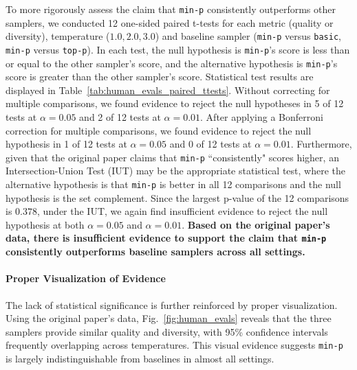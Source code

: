 To more rigorously assess the claim that \texttt{min-p} consistently outperforms other samplers, we conducted 12 one-sided paired t-tests for each metric (quality or diversity), temperature ($1.0, 2.0, 3.0$) and baseline sampler (\texttt{min-p} versus \texttt{basic}, \texttt{min-p} versus \texttt{top-p}). In each test, the null hypothesis is \texttt{min-p}'s score is less than or equal to the other sampler's score, and the alternative hypothesis is \texttt{min-p}'s score is greater than the other sampler's score.
Statistical test results are displayed in Table~\ref{tab:human_evals_paired_ttests}.
Without correcting for multiple comparisons, we found evidence to reject the null hypotheses in 5 of 12 tests at $\alpha=0.05$ and 2 of 12 tests at $\alpha=0.01$. After applying a Bonferroni correction for multiple comparisons, we found evidence to reject the null hypothesis in 1 of 12 tests at $\alpha=0.05$ and 0 of 12 tests at $\alpha=0.01$.
Furthermore, given that the original paper claims that \texttt{min-p} ``consistently" scores higher, an Intersection-Union Test (IUT) may be the appropriate statistical test, where the alternative hypothesis is that \texttt{min-p} is better in all 12 comparisons and the null hypothesis is the set complement. Since the largest p-value of the 12 comparisons is $0.378$, under the IUT, we again find insufficient evidence to reject the null hypothesis at both $\alpha=0.05$ and $\alpha=0.01$.
\textbf{Based on the original paper's data, there is insufficient evidence to support the claim that \texttt{min-p} consistently outperforms baseline samplers across all settings.}



\paragraph{Proper Visualization of Evidence}

The lack of statistical significance is further reinforced by proper visualization. Using the original paper's data, Fig.~\ref{fig:human_evals} reveals that the three samplers provide similar quality and diversity, with 95\% confidence intervals frequently overlapping across temperatures. This visual evidence suggests \texttt{min-p} is largely indistinguishable from baselines in almost all settings.

